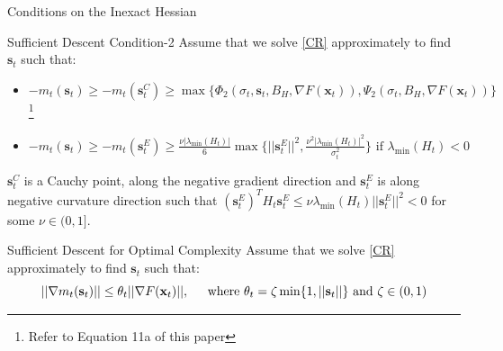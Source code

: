 \documentclass[10pt]{beamer}
\newcommand{\g}{\nabla}
\newcommand{\xbold}{\mathbf{x}}
\newcommand{\sbold}{\mathbf{s}}
\newcommand{\mineig}{\lambda_{\min}}
\begin{document}
\begin{frame}{Conditions on the Inexact Hessian}
\begin{alertblock}{Sufficient Descent Condition-2}
Assume that we solve \ref{CR} approximately to find \(\sbold_{t}\) such that:
\begin{itemize}
\item \(-m_{t}(\sbold_{t}) \geq -m_{t}(\sbold_{t}^{C}) \geq \max\lbrace\Phi_{2}(\sigma_{t}, \sbold_{t}, B_{H}, \g F(\xbold_{t})), \Psi_{2}(\sigma_{t}, B_{H}, \g F(\xbold_{t}))\rbrace\)\footnote{Refer to Equation 11a of this paper}
\item \(-m_{t}(\sbold_{t}) \geq -m_{t}(\sbold_{t}^{E}) \geq \frac{\nu|\mineig(H_{t})|}{6} \max\lbrace ||\sbold_{t}^{E}||^{2}, \frac{\nu^{2}|\mineig(H_{t})|^{2}}{\sigma_{t}^{2}}\rbrace \text{ if } \mineig(H_{t}) < 0\)
\end{itemize}
\(\sbold_{t}^{C}\) is a Cauchy point, along the negative gradient direction and \(\sbold_{t}^{E}\) is along negative curvature direction such that \((\sbold_{t}^{E})^{T} H_{t} \sbold_{t}^{E} \leq \nu\mineig(H_{t})||\sbold_{t}^{E}||^{2} < 0\) for some \(\nu \in (0, 1]\).
\end{alertblock}
\pause
\begin{alertblock}{Sufficient Descent for Optimal Complexity}
Assume that we solve \ref{CR} approximately to find \(\sbold_{t}\) such that:
\[||\nabla m_{t}(\sbold_{t})|| \leq \theta_{t}||\g F(\xbold_{t})||, \hspace{4mm} \text{ where }\theta_{t} = \zeta\min\{1, ||\sbold_{t}||\} \text{ and } \zeta \in (0, 1) \]
\end{alertblock}
\end{frame}
\end{document}
